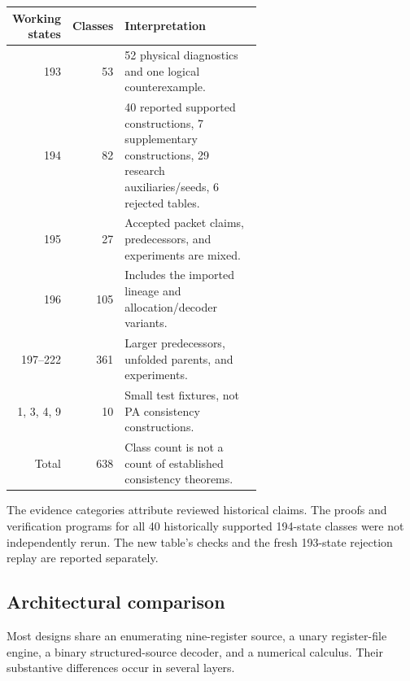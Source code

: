 \documentclass[10pt,letterpaper]{article}
\begin{document}
\begin{center}
\begin{tabular}{r r p{0.61\linewidth}}
\toprule
Working states & Classes & Interpretation\\
\midrule
193 & 53 & 52 physical diagnostics and one logical counterexample.\\
194 & 82 & 40 reported supported constructions, 7 supplementary
constructions, 29 research auxiliaries/seeds, 6 rejected tables.\\
195 & 27 & Accepted packet claims, predecessors, and experiments are mixed.\\
196 & 105 & Includes the imported lineage and allocation/decoder variants.\\
197--222 & 361 & Larger predecessors, unfolded parents, and experiments.\\
1, 3, 4, 9 & 10 & Small test fixtures, not PA consistency constructions.\\
\midrule
Total & 638 & Class count is not a count of established consistency theorems.\\
\bottomrule
\end{tabular}
\end{center}

The evidence categories attribute reviewed historical claims. The proofs
and verification programs for all 40 historically supported 194-state
classes were not independently rerun. The new table's checks and the fresh
193-state rejection replay are reported separately.

\subsection{Architectural comparison}

Most designs share an enumerating nine-register source, a unary
register-file engine, a binary structured-source decoder, and a numerical
calculus. Their substantive differences occur in several layers.
\end{document}
